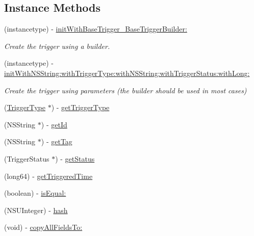 \subsection*{Instance Methods}
\begin{DoxyCompactItemize}
\item 
(instancetype) -\/ \hyperlink{interface_base_trigger_a47059c84cbf68e70736dbf5c93450125}{init\+With\+Base\+Trigger\+\_\+\+Base\+Trigger\+Builder\+:}
\begin{DoxyCompactList}\small\item\em Create the trigger using a builder. \end{DoxyCompactList}\item 
(instancetype) -\/ \hyperlink{interface_base_trigger_a52709fdb27fa9b2c793c535f9cf9c8e4}{init\+With\+N\+S\+String\+:with\+Trigger\+Type\+:with\+N\+S\+String\+:with\+Trigger\+Status\+:with\+Long\+:}
\begin{DoxyCompactList}\small\item\em Create the trigger using parameters (the builder should be used in most cases) \end{DoxyCompactList}\item 
(\hyperlink{interface_trigger_type}{Trigger\+Type} $\ast$) -\/ \hyperlink{interface_base_trigger_a7aca18e5bbd7e02177a13e3152b6c186}{get\+Trigger\+Type}
\item 
(N\+S\+String $\ast$) -\/ \hyperlink{interface_base_trigger_a4ff06fff582f8d5fc5bed5b584a246a7}{get\+Id}
\item 
(N\+S\+String $\ast$) -\/ \hyperlink{interface_base_trigger_a2963ebc08542a9cdd3aac2ce38286d48}{get\+Tag}
\item 
(Trigger\+Status $\ast$) -\/ \hyperlink{interface_base_trigger_ab3a7d6591d246e80a73e47c28e02e1cc}{get\+Status}
\item 
(long64) -\/ \hyperlink{interface_base_trigger_a65bfe996fa8060fd14782ad0e681f129}{get\+Triggered\+Time}
\item 
(boolean) -\/ \hyperlink{interface_base_trigger_a378e9b8ad95bc3fd2ad8b57afe234e62}{is\+Equal\+:}
\item 
(N\+S\+U\+Integer) -\/ \hyperlink{interface_base_trigger_aa9e3b3444ffe4aa0699e755a6f69b4d0}{hash}
\item 
(void) -\/ \hyperlink{interface_base_trigger_a79ae518aac19e59563a92c9cc3d84078}{copy\+All\+Fields\+To\+:}
\end{DoxyCompactItemize}
